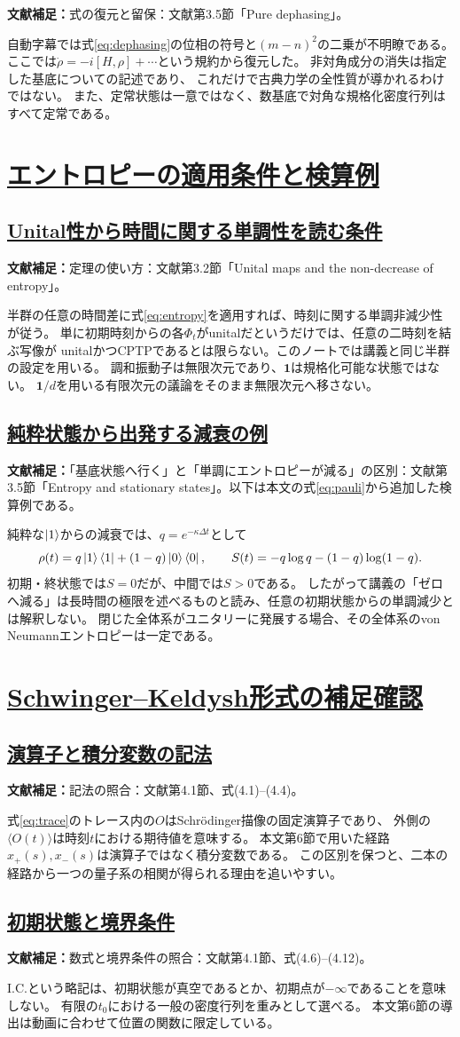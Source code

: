 \documentclass[a4paper,11pt]{ltjsarticle}
\newcommand{\sectionlink}[1]{\section[#1]{\hyperlink{toc}{#1}}}
\newcommand{\subsectionlink}[1]{\subsection[#1]{\hyperlink{toc}{#1}}}
\numberwithin{equation}{section}
\newcommand{\id}{\mathbf{1}}
\newcommand{\av}[1]{\langle #1\rangle}
\newcommand{\supplement}[1]{\par\medskip\noindent\textcolor{notered}{\textbf{文献補足：}}#1\par\smallskip}
\begin{document}
\supplement{式の復元と留保：文献\cite{Pajer:2026fuo}第3.5節「Pure dephasing」。}
自動字幕では式\eqref{eq:dephasing}の位相の符号と$(m-n)^2$の二乗が不明瞭である。
ここでは$\dot\rho=-i[H,\rho]+\cdots$という規約から復元した。
非対角成分の消失は指定した基底についての記述であり、
これだけで古典力学の全性質が導かれるわけではない。
また、定常状態は一意ではなく、数基底で対角な規格化密度行列はすべて定常である。

\clearpage
\sectionlink{エントロピーの適用条件と検算例}
\label{app:entropy}

\subsectionlink{Unital性から時間に関する単調性を読む条件}
\label{app:entropy_conditions}
\supplement{定理の使い方：文献\cite{Pajer:2026fuo}第3.2節「Unital maps and the non-decrease of entropy」。}
半群の任意の時間差に式\eqref{eq:entropy}を適用すれば、時刻に関する単調非減少性が従う。
単に初期時刻からの各$\Phi_t$がunitalだというだけでは、任意の二時刻を結ぶ写像が
unitalかつCPTPであるとは限らない。このノートでは講義と同じ半群の設定を用いる。
調和振動子は無限次元であり、$\id$は規格化可能な状態ではない。
$\id/d$を用いる有限次元の議論をそのまま無限次元へ移さない。

\subsectionlink{純粋状態から出発する減衰の例}
\label{app:entropy_example}
\supplement{「基底状態へ行く」と「単調にエントロピーが減る」の区別：文献\cite{Pajer:2026fuo}第3.5節「Entropy and stationary states」。以下は本文の式\eqref{eq:pauli}から追加した検算例である。}
純粋な$\ket1$からの減衰では、$q=e^{-\kappa\Delta t}$として
\begin{equation}
 \rho(t)=q\ket1\bra1+(1-q)\ket0\bra0,\qquad
 S(t)=-q\log q-(1-q)\log(1-q).
\end{equation}
初期・終状態では$S=0$だが、中間では$S>0$である。
したがって講義の「ゼロへ減る」は長時間の極限を述べるものと読み、任意の初期状態からの単調減少とは解釈しない。
閉じた全体系がユニタリーに発展する場合、その全体系のvon Neumannエントロピーは一定である。

\clearpage
\sectionlink{Schwinger--Keldysh形式の補足確認}
\label{app:sk}

\subsectionlink{演算子と積分変数の記法}
\label{app:notation}
\supplement{記法の照合：文献\cite{Pajer:2026fuo}第4.1節、式(4.1)--(4.4)。}
式\eqref{eq:trace}のトレース内の$O$はSchr\"odinger描像の固定演算子であり、
外側の$\av{O(t)}$は時刻$t$における期待値を意味する。
本文第6節で用いた経路$x_+(s),x_-(s)$は演算子ではなく積分変数である。
この区別を保つと、二本の経路から一つの量子系の相関が得られる理由を追いやすい。

\subsectionlink{初期状態と境界条件}
\label{app:boundary}
\supplement{数式と境界条件の照合：文献\cite{Pajer:2026fuo}第4.1節、式(4.6)--(4.12)。}
I.C.という略記は、初期状態が真空であるとか、初期点が$-\infty$であることを意味しない。
有限の$t_0$における一般の密度行列を重みとして選べる。
本文第6節の導出は動画に合わせて位置の関数に限定している。
\end{document}
